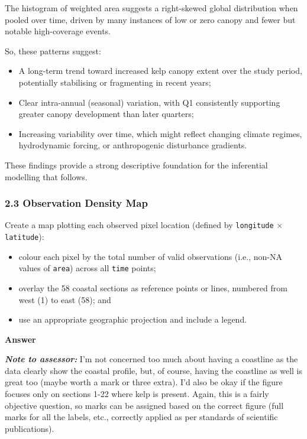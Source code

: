 \documentclass[
  british,
  10pt,
]{article}
\providecommand{\tightlist}{%
  \setlength{\itemsep}{0pt}\setlength{\parskip}{0pt}}
\let\oldtexttt\texttt
\renewcommand{\texttt}[1]{\oldtexttt{\small #1}}
\begin{document}
The histogram of weighted area suggests a right-skewed global
distribution when pooled over time, driven by many instances of low or
zero canopy and fewer but notable high-coverage events.

So, these patterns suggest:

\begin{itemize}
\tightlist
\item
  A long-term trend toward increased kelp canopy extent over the study
  period, potentially stabilising or fragmenting in recent years;
\item
  Clear intra-annual (seasonal) variation, with Q1 consistently
  supporting greater canopy development than later quarters;
\item
  Increasing variability over time, which might reflect changing climate
  regimes, hydrodynamic forcing, or anthropogenic disturbance gradients.
\end{itemize}

These findings provide a strong descriptive foundation for the
inferential modelling that follows.

\subsubsection{2.3 Observation Density
Map}\label{observation-density-map}

Create a map plotting each observed pixel location (defined by
\texttt{longitude} × \texttt{latitude}):

\begin{itemize}
\tightlist
\item
  colour each pixel by the total number of valid observations (i.e.,
  non-NA values of \texttt{area}) across all \texttt{time} points;
\item
  overlay the 58 coastal sections as reference points or lines, numbered
  from west (1) to east (58); and
\item
  use an appropriate geographic projection and include a legend.
\end{itemize}

\textbf{Answer}

\textbf{\emph{Note to assessor:}} I'm not concerned too much about
having a coastline as the data clearly show the coastal profile, but, of
course, having the coastline as well is great too (maybe worth a mark or
three extra). I'd also be okay if the figure focuses only on sections
1-22 where kelp is present. Again, this is a fairly objective question,
so marks can be assigned based on the correct figure (full marks for all
the labels, etc., correctly applied as per standards of scientific
publications).
\end{document}
